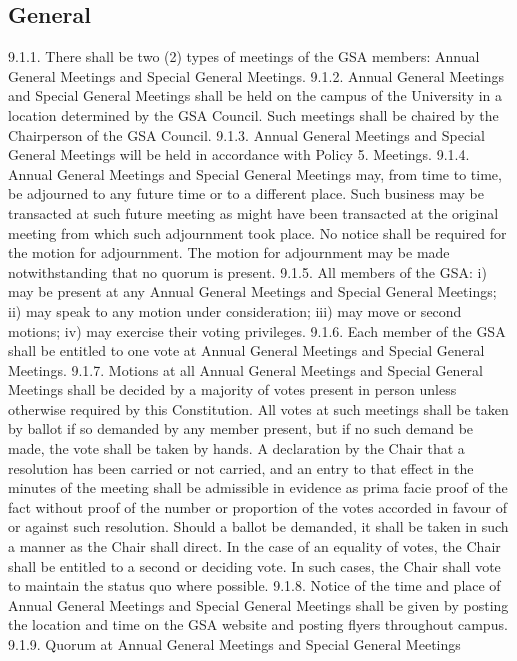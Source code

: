 \documentclass{article}
\begin{document}
\subsection{General} 
9.1.1. There shall be two (2) types of meetings of the GSA members: Annual 
General Meetings and Special General Meetings. 
9.1.2. Annual General Meetings and Special General Meetings shall be held 
on the campus of the University in a location determined by the GSA 
Council. Such meetings shall be chaired by the Chairperson of the GSA Council. 
9.1.3. Annual General Meetings and Special General Meetings will be held 
in accordance with Policy 5. Meetings. 
9.1.4. Annual General Meetings and Special General Meetings may, from 
time to time, be adjourned to any future time or to a different place. 
Such business may be transacted at such future meeting as might have 
been transacted at the original meeting from which such adjournment 
took place. No notice shall be required for the motion for adjournment. 
The motion for adjournment may be made notwithstanding that no 
quorum is present. 
9.1.5. All members of the GSA: 
i) may be present at any Annual General Meetings and Special General 
Meetings; 
ii) may speak to any motion under consideration; 
iii) may move or second motions; 
iv) may exercise their voting privileges. 
9.1.6. Each member of the GSA shall be entitled to one vote at Annual 
General Meetings and Special General Meetings. 
9.1.7. Motions at all Annual General Meetings and Special General Meetings 
shall be decided by a majority of votes present in person unless 
otherwise required by this Constitution. All votes at such meetings 
shall be taken by ballot if so demanded by any member present, but if 
no such demand be made, the vote shall be taken by hands. A 
declaration by the Chair that a resolution has been carried or not 
carried, and an entry to that effect in the minutes of the meeting shall 
be admissible in evidence as prima facie proof of the fact without 
proof of the number or proportion of the votes accorded in favour of or 
against such resolution. Should a ballot be demanded, it shall be taken 
in such a manner as the Chair shall direct. In the case of an equality of 
votes, the Chair shall be entitled to a second or deciding vote. In such 
cases, the Chair shall vote to maintain the status quo where possible. 
9.1.8. Notice of the time and place of Annual General Meetings and Special 
General Meetings shall be given by posting the location and time on 
the GSA website and posting flyers throughout campus. 
9.1.9. Quorum at Annual General Meetings and Special General Meetings 
\end{document}
